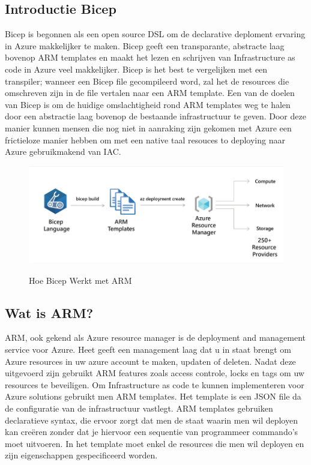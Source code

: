 \subsection{Introductie Bicep}%

Bicep is begonnen als een open source DSL om de declarative deploment ervaring in Azure makkelijker te maken.
Bicep geeft een transparante, abstracte laag bovenop ARM templates en maakt het lezen en schrijven van Infrastructure as code in Azure veel makkelijker.
Bicep is het best te vergelijken met een transpiler; wanneer een Bicep file gecompileerd word, zal het de resources die omschreven zijn in de file vertalen naar een ARM template.
Een van de doelen van Bicep is om de huidige omslachtigheid rond ARM templates weg te halen door een abstractie laag bovenop de bestaande infrastructuur te geven.
Door deze manier kunnen mensen die nog niet in aanraking zijn gekomen met Azure een frictieloze manier hebben om met een native taal resouces to deploying naar Azure gebruikmakend van IAC.
\autocite{Rend_n_2022}
\begin{figure}[h!]
    \includegraphics[width=.49\textwidth]{img/BicepSchema}
    \caption{Hoe Bicep Werkt met ARM}
    \label{fig:Bicep}
    \autocite{Rend_n_2022}
\end{figure}



\subsection{Wat is ARM?}%

ARM, ook gekend als Azure resource manager is de deployment and management service voor Azure. Heet geeft een management laag dat u in staat brengt om Azure resources in uw azure account te maken, updaten of deleten.
Nadat deze uitgevoerd zijn gebruikt ARM features zoals access controle, locks en tags om uw resources te beveiligen.
\autocite{ARM2022}
Om Infrastructure as code te kunnen implementeren voor Azure solutions gebruikt men ARM templates.
Het template is een JSON file da de configuratie van de infrastructuur vastlegt. ARM templates gebruiken declaratieve syntax, die ervoor zorgt dat men de staat waarin men wil deployen kan creëren  zonder dat je hiervoor een sequentie van programmeer commando's moet uitvoeren.
In het template moet enkel de resources die men wil deployen en zijn eigenschappen gespecificeerd worden.

